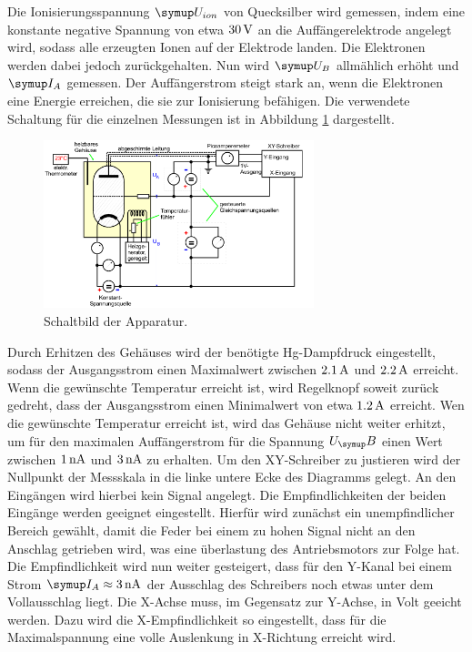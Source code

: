 Die Ionisierungsspannung $\su{U_{ion}}$ von Quecksilber wird gemessen, indem eine
konstante negative Spannung von etwa $30\,\si{\volt}$ an die Auffängerelektrode angelegt
wird, sodass alle erzeugten Ionen auf der Elektrode landen. Die Elektronen werden
dabei jedoch zurückgehalten.
Nun wird $\su{U_B}$ allmählich erhöht und $\su{I_A}$ gemessen. Der Auffängerstrom
steigt stark an, wenn die Elektronen eine Energie erreichen, die sie zur
Ionisierung befähigen.
Die verwendete Schaltung für die einzelnen Messungen ist in Abbildung \ref{fig:schalt}
dargestellt.
\begin{figure}
  \centering
  \includegraphics[width=0.7\textwidth]{bilder/schalt.jpg}
  \caption{Schaltbild der Apparatur\cite{601}.}
  \label{fig:schalt}
\end{figure}
Durch Erhitzen des Gehäuses wird der benötigte Hg-Dampfdruck eingestellt, sodass
der Ausgangsstrom einen Maximalwert zwischen $2.1\,\si{\ampere}$ und $2.2\,\si{\ampere}$ erreicht.
Wenn die gewünschte Temperatur erreicht ist, wird Regelknopf soweit zurück
gedreht, dass der Ausgangsstrom einen Minimalwert von etwa $1.2\,\si{\ampere}$ erreicht.
Wen die gewünschte Temperatur erreicht ist, wird das Gehäuse nicht weiter erhitzt,
um für den maximalen Auffängerstrom für die Spannung $U_\su{B}$ einen Wert zwischen
$1\,\si{\nano\ampere}$ und $3\,\si{\nano\ampere}$ zu erhalten.
Um den XY-Schreiber zu justieren wird der Nullpunkt der Messskala in die
linke untere Ecke des Diagramms gelegt. An den Eingängen wird hierbei kein
Signal angelegt. Die Empfindlichkeiten der beiden Eingänge werden geeignet
eingestellt. Hierfür wird zunächst ein unempfindlicher Bereich gewählt, damit
die Feder bei einem zu hohen Signal nicht an den Anschlag getrieben wird, was
eine überlastung des Antriebsmotors zur Folge hat. Die Empfindlichkeit wird nun
weiter gesteigert, dass für den Y-Kanal bei einem Strom $\su{I_A}\approx3\nA$
der Ausschlag des Schreibers noch etwas unter dem Vollausschlag liegt. Die
X-Achse muss, im Gegensatz zur Y-Achse, in Volt geeicht werden. Dazu wird
die X-Empfindlichkeit so eingestellt, dass für die Maximalspannung eine volle
Auslenkung in X-Richtung erreicht wird.
